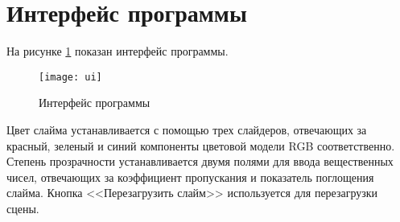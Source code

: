 \section{Интерфейс программы}

На рисунке \ref{ui} показан интерфейс программы.

\begin{figure}[H]
	\centering
	\texttt{[image: ui]}
	\caption{Интерфейс программы}
	\label{ui}
\end{figure}

Цвет слайма устанавливается с помощью трех слайдеров, отвечающих за красный, зеленый и синий компоненты цветовой модели RGB соответственно. Степень прозрачности устанавливается двумя полями для ввода вещественных чисел, отвечающих за коэффициент пропускания и показатель поглощения слайма. Кнопка <<Перезагрузить слайм>> используется для перезагрузки сцены.

\clearpage
